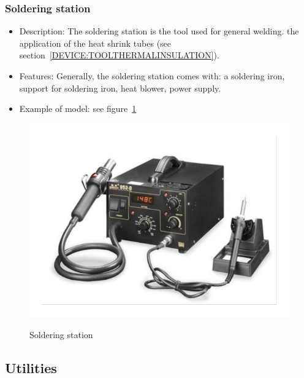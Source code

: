 \subsubsection{Soldering station} \label{DEVICE:TOOLSOLDERINGSTATION}
\begin{itemize}
  \item Description: The soldering station is the tool used for general welding. the application of the heat shrink tubes (see section~\ref{DEVICE:TOOLTHERMALINSULATION}).
  \item Features: Generally, the soldering station comes with: a soldering iron, support for soldering iron, heat blower, power supply.
  \item Example of model: see figure~\ref{FIG:DEVICESOLDERINGSTATION}
\end{itemize}
\begin{figure}
  \centering
  \includegraphics[angle=90,width=1\columnwidth]{figs/body02/FIGDEVICESOLDERINGSTATION.pdf}\\
  \caption[Soldering station]{Soldering station}
  \label{FIG:DEVICESOLDERINGSTATION}
\end{figure}
\subsection{Utilities}
